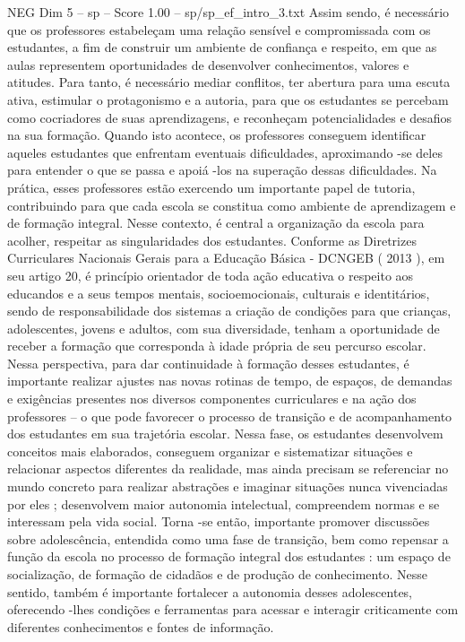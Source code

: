 \begin{textsample}{NEG Dim 5 – sp – Score 1.00 – sp/sp\_ef\_intro\_3.txt}
Assim sendo, é necessário que os professores estabeleçam uma relação sensível e compromissada com os estudantes, a fim de construir um ambiente de confiança e respeito, em que as aulas representem oportunidades de desenvolver conhecimentos, valores e atitudes.
Para tanto, é necessário mediar conflitos, ter abertura para uma escuta ativa, estimular o protagonismo e a autoria, para que os estudantes se percebam como cocriadores de suas aprendizagens, e reconheçam potencialidades e desafios na sua formação.
Quando isto acontece, os professores conseguem identificar aqueles estudantes que enfrentam eventuais dificuldades, aproximando -se deles para entender o que se passa e apoiá -los na superação dessas dificuldades.
Na prática, esses professores estão exercendo um importante papel de tutoria, contribuindo para que cada escola se constitua como ambiente de aprendizagem e de formação integral.
Nesse contexto, é central a organização da escola para acolher, respeitar as singularidades dos estudantes.
Conforme as Diretrizes Curriculares Nacionais Gerais para a Educação Básica - DCNGEB ( 2013 ), em seu artigo 20, é princípio orientador de toda ação educativa o respeito aos educandos e a seus tempos mentais, socioemocionais, culturais e identitários, sendo de responsabilidade dos sistemas a criação de condições para que crianças, adolescentes, jovens e adultos, com sua diversidade, tenham a oportunidade de receber a formação que corresponda à idade própria de seu percurso escolar.
Nessa perspectiva, para dar continuidade à formação desses estudantes, é importante realizar ajustes nas novas rotinas de tempo, de espaços, de demandas e exigências presentes nos diversos componentes curriculares e na ação dos professores – o que pode favorecer o processo de transição e de acompanhamento dos estudantes em sua trajetória escolar.
Nessa fase, os estudantes desenvolvem conceitos mais elaborados, conseguem organizar e sistematizar situações e relacionar aspectos diferentes da realidade, mas ainda precisam se referenciar no mundo concreto para realizar abstrações e imaginar situações nunca vivenciadas por eles ; desenvolvem maior autonomia intelectual, compreendem normas e se interessam pela vida social.
Torna -se então, importante promover discussões sobre adolescência, entendida como uma fase de transição, bem como repensar a função da escola no processo de formação integral dos estudantes : um espaço de socialização, de formação de cidadãos e de produção de conhecimento.
Nesse sentido, também é importante fortalecer a autonomia desses adolescentes, oferecendo -lhes condições e ferramentas para acessar e interagir criticamente com diferentes conhecimentos e fontes de informação.

\end{textsample}
